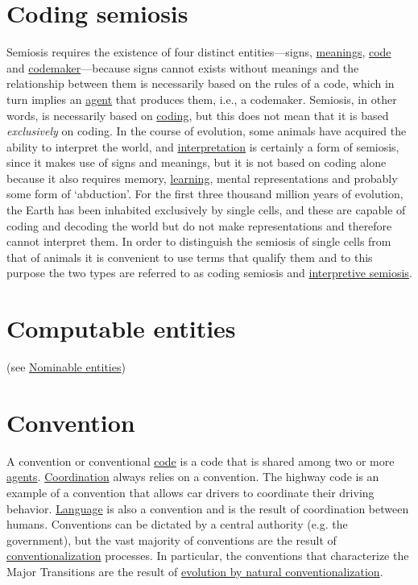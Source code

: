 \documentclass[12pt]{article}
\begin{document}
\section{Coding semiosis}
Semiosis requires the existence of four distinct entities---signs, \hyperlink{meaning}{meanings}, \hyperlink{code}{code} and \hyperlink{codemakers}{codemaker}---because signs cannot exists without meanings and the relationship between them is necessarily based on the rules of a code, which in turn implies an \hyperlink{agent}{agent} that produces them, i.e., a codemaker. Semiosis, in other words, is necessarily based on \hyperlink{copying_and_coding}{coding}, but this does not mean that it is based \textit{exclusively} on coding. In the course of evolution, some animals have acquired the ability to interpret the world, and \hyperlink{interpretation}{interpretation} is certainly a form of semiosis, since it makes use of signs and meanings, but it is not based on coding alone because it also requires memory, \hyperlink{learning}{learning}, mental representations and probably some form of `abduction'. For the first three thousand million years of evolution, the Earth has been inhabited exclusively by single cells, and these are capable of coding and decoding the world but do not make representations and therefore cannot interpret them. In order to distinguish the semiosis of single cells from that of animals it is convenient to use terms that qualify them and to this purpose the two types are referred to as coding semiosis and \hyperlink{interpretive_semiosis}{interpretive semiosis}.


\hypertarget{computable_entities}{}
\section{Computable entities} (see \hyperlink{nominable_entities}{Nominable entities})

\hypertarget{convention}{}
\section{Convention}

A convention or conventional \hyperlink{code}{code} is a code that is shared among two
or more \hyperlink{agent}{agents}. \hyperlink{coordination}{Coordination} always relies
on a convention. The highway code is an example of a convention that
allows car drivers to coordinate their driving behavior. \hyperlink{language}{Language} is
also a convention and is the result of coordination between
humans. Conventions can be dictated by a central authority (e.g. the
government), but the vast majority of conventions are the result of
\hyperlink{conventionalization}{conventionalization} processes. In
particular, the conventions that characterize the Major Transitions
are the result of \hyperlink{natural_conventionalization}{evolution by
  natural conventionalization}.
\end{document}
